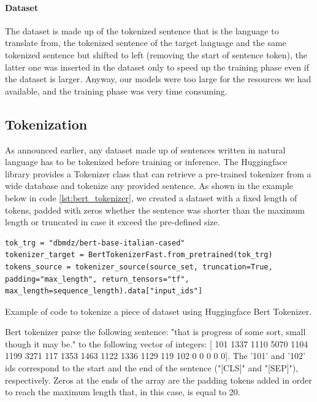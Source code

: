 \paragraph{Dataset} The dataset is made up of the tokenized sentence that is the language to translate from, the tokenized sentence of the target language and the same tokenized sentence but shifted to left (removing the start of sentence token), the latter one was inserted in the dataset only to speed up the training phase even if the dataset is larger. Anyway, our models were too large for the resources we had available, and the training phase was very time consuming.

\subsection{Tokenization}
As announced earlier, any dataset made up of sentences written in natural language has to be tokenized before training or inference. The Huggingface library provides a Tokenizer class that can retrieve a pre-trained tokenizer from a wide database and tokenize any provided sentence. As shown in the example below in code \ref{lst:bert_tokenizer}, we created a dataset with a fixed length of tokens, padded with zeros whether the sentence was shorter than the maximum length or truncated in case it exceed the pre-defined size.
\begin{listing}[H]
\begin{verbatim}
tok_trg = "dbmdz/bert-base-italian-cased"
tokenizer_target = BertTokenizerFast.from_pretrained(tok_trg) 
tokens_source = tokenizer_source(source_set, truncation=True,                      padding="max_length", return_tensors="tf",                         max_length=sequence_length).data["input_ids"]
\end{verbatim}
\caption{Example of code to tokenize a piece of dataset using Huggingface Bert Tokenizer.}
\label{lst:bert_tokenizer}
\end{listing}
\begin{exmp}
Bert tokenizer parse the following sentence: "that is progress of some sort, small though it may be." to the following vector of integers: [ 101 1337 1110 5070 1104 1199 3271  117 1353 1463 1122 1336 1129 119 102 0 0 0 0 0]. The '101' and '102' ids correspond to the start and the end of the sentence ("[CLS]" and "[SEP]"), respectively. Zeros at the ends of the array are the padding tokens added in order to reach the maximum length that, in this case, is equal to 20.
\end{exmp}

